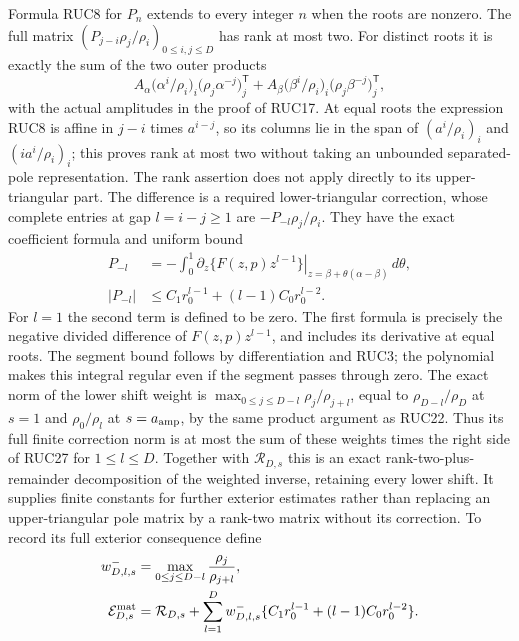 Formula RUC8 for $P_n$ extends to every integer $n$ when the roots
are nonzero.  The full matrix
$(P_{j-i}\rho_j/\rho_i)_{0\le i,j\le D}$ has rank at most two.
For distinct roots it is exactly the sum of the two outer products
\[
 A_\alpha\bigl(\alpha^i/\rho_i\bigr)_i
                  \bigl(\rho_j\alpha^{-j}\bigr)_j^{\mathsf T}
 +A_\beta\bigl(\beta^i/\rho_i\bigr)_i
                  \bigl(\rho_j\beta^{-j}\bigr)_j^{\mathsf T},
 \tag{RUC26}
\]
with the actual amplitudes in the proof of RUC17.
At equal roots the expression RUC8 is affine in $j-i$ times
$a^{i-j}$, so its columns lie in the span of
$(a^i/\rho_i)_i$ and $(ia^i/\rho_i)_i$; this proves rank at most
two without taking an unbounded separated-pole representation.
The rank assertion does not apply directly to its upper-triangular
part.  The difference is a required lower-triangular correction,
whose complete entries at gap $l=i-j\ge1$ are $-P_{-l}\rho_j/\rho_i$.
They have the exact coefficient formula and uniform bound
\[
 \begin{aligned}
 P_{-l}&=-\int_0^1
   \left.\partial_z\{F(z,p)z^{l-1}\}\right|_{
                  z=\beta+\theta(\alpha-\beta)}\,d\theta,\\
 |P_{-l}|&\le C_1r_0^{l-1}+(l-1)C_0r_0^{l-2}.
 \end{aligned}\tag{RUC27}
\]
For $l=1$ the second term is defined to be zero.
The first formula is precisely the negative divided difference
of $F(z,p)z^{l-1}$, and includes its derivative at equal roots.
The segment bound follows by differentiation and RUC3; the
polynomial makes this integral regular even if the segment passes
through zero.  The exact norm of the lower shift weight is
$\max_{0\le j\le D-l}\rho_j/\rho_{j+l}$, equal to
$\rho_{D-l}/\rho_D$ at $s=1$ and $\rho_0/\rho_l$ at
$s=a_{\rm amp}$, by the same product argument as RUC22.
Thus its full finite correction norm is at most the sum of
these weights times the right side of RUC27 for $1\le l\le D$.
Together with $\mathcal R_{D,s}$ this is an exact rank-two-plus-
remainder decomposition of the weighted inverse, retaining every
lower shift.  It supplies finite constants for further exterior
estimates rather than replacing an upper-triangular pole matrix
by a rank-two matrix without its correction.
To record its full exterior consequence define
\[
 \begin{aligned}
 w^-_{D,l,s}&=\max_{0\le j\le D-l}\frac{\rho_j}{\rho_{j+l}},\\
 \mathcal E_{D,s}^{\rm mat}
 &=\mathcal R_{D,s}+
   \sum_{l=1}^D w^-_{D,l,s}
        \{C_1r_0^{l-1}+(l-1)C_0r_0^{l-2}\}.
 \end{aligned}
\]
